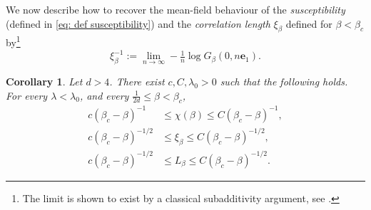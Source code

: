 \documentclass[11pt,a4paper]{article}
\numberwithin{equation}{section}
\theoremstyle{plain}
\newtheorem{Cor}[Thm]{Corollary}
\theoremstyle{definition}
\begin{document}
We now describe how to recover the mean-field behaviour of the {\em susceptibility} (defined in \eqref{eq: def susceptibility}) and the {\em correlation length} $\xi_\beta$ defined for $\beta<\beta_c$ by\footnote{The limit is shown to exist by a classical subadditivity argument, see \cite[Chapter~4]{MadrasSlade2013SAW}.} 
\begin{equation}\label{eq: def corr length wsaw}
	\xi_\beta^{-1}:=\lim_{n\rightarrow \infty}-\tfrac{1}{n}\log G_\beta(0,n\mathbf{e}_1).
\end{equation}
\begin{Cor}\label{cor: critical exponents} Let $d>4$. 
There exist  $c,C,\lambda_0>0$ such that the following holds. For every $\lambda<\lambda_0$, and every $\frac{1}{2d}\le \beta<\beta_c$,
\begin{align}\label{eq: bounds susceptibility}
	c(\beta_c-\beta)^{-1}&\leq \chi(\beta)\leq C(\beta_c-\beta)^{-1},
	\\ \label{eq: bounds xi}
	c(\beta_c-\beta)^{-1/2}&\leq \xi_\beta\leq C(\beta_c-\beta)^{-1/2},
	\\ \label{eq: bounds L}
	c(\beta_c-\beta)^{-1/2}&\leq L_\beta\leq C(\beta_c-\beta)^{-1/2}.
\end{align}
\end{Cor}
\end{document}
